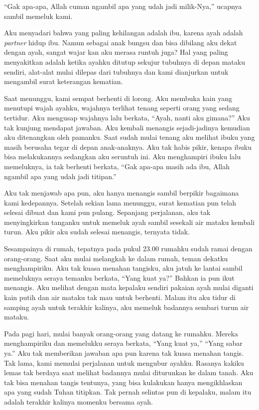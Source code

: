 ``Gak apa-apa, Allah cuman ngambil apa yang udah jadi milik-Nya,'' ucapnya sambil memeluk kami.

Aku menyadari bahwa yang paling kehilangan adalah ibu, karena ayah adalah \textit{partner} hidup ibu. Namun sebagai anak bungsu dan bisa dibilang aku dekat dengan ayah, sangat wajar kan aku merasa runtuh juga? Hal yang paling menyakitkan adalah ketika ayahku ditutup sekujur tubuhnya di depan mataku sendiri, alat-alat mulai dilepas dari tubuhnya dan kami dianjurkan untuk mengambil surat keterangan kematian.

Saat menunggu, kami sempat berhenti di lorong. Aku membuka kain yang menutupi wajah ayahku, wajahnya terlihat tenang seperti orang yang sedang tertidur. Aku mengusap wajahnya lalu berkata, ``Ayah, nanti aku gimana?'' Aku tak kunjung mendapat jawaban. Aku kembali menangis sejadi-jadinya kemudian aku ditenangkan oleh pamanku. Saat sudah mulai tenang aku melihat ibuku yang masih berusaha tegar di depan anak-anaknya. Aku tak habis pikir, kenapa ibuku bisa melakukannya sedangkan aku seruntuh ini. Aku menghampiri ibuku lalu memeluknya, ia tak berhenti berkata, ``Gak apa-apa masih ada ibu, Allah ngambil apa yang udah jadi titipan.''

Aku tak menjawab apa pun, aku hanya menangis sambil berpikir bagaimana kami kedepannya. Setelah sekian lama menunggu, surat kematian pun telah selesai dibuat dan kami pun pulang. Sepanjang perjalanan, aku tak menyingkirkan tanganku untuk memeluk ayah sambil sesekali air mataku kembali turun. Aku pikir aku sudah selesai menangis, ternyata tidak.

Sesampainya di rumah, tepatnya pada pukul 23.00 rumahku sudah ramai dengan orang-orang. Saat aku mulai melangkah ke dalam rumah, teman dekatku menghampiriku. Aku tak kuasa menahan tangisku, aku jatuh ke lantai sambil memeluknya seraya temanku berkata, ``Yang kuat ya?'' Bahkan ia pun ikut menangis. Aku melihat dengan mata kepalaku sendiri pakaian ayah mulai diganti kain putih dan air mataku tak mau untuk berhenti. Malam itu aku tidur di samping ayah untuk terakhir kalinya, aku memeluk badannya sembari turun air mataku. 

Pada pagi hari, mulai banyak orang-orang yang datang ke rumahku. Mereka menghampiriku dan memelukku seraya berkata, ``Yang kuat ya,'' ``Yang sabar ya.'' Aku tak memberikan jawaban apa pun karena tak kuasa menahan tangis. Tak lama, kami memulai perjalanan untuk mengubur ayahku. Rasanya kakiku lemas tak berdaya saat melihat badannya mulai diturunkan ke dalam tanah. Aku tak bisa menahan tangis tentunya, yang bisa kulakukan hanya mengikhlaskan apa yang sudah Tuhan titipkan. Tak pernah selintas pun di kepalaku, malam itu adalah terakhir kalinya momenku bersama ayah.

